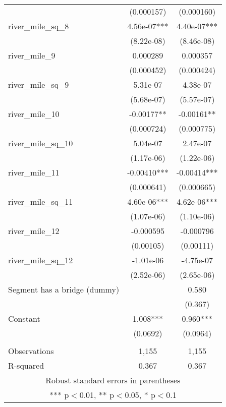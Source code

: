 \begin{tabular}{lcc}
 & (0.000157) & (0.000160) \\
river\_mile\_sq\_8 & 4.56e-07*** & 4.40e-07*** \\
 & (8.22e-08) & (8.46e-08) \\
river\_mile\_9 & 0.000289 & 0.000357 \\
 & (0.000452) & (0.000424) \\
river\_mile\_sq\_9 & 5.31e-07 & 4.38e-07 \\
 & (5.68e-07) & (5.57e-07) \\
river\_mile\_10 & -0.00177** & -0.00161** \\
 & (0.000724) & (0.000775) \\
river\_mile\_sq\_10 & 5.04e-07 & 2.47e-07 \\
 & (1.17e-06) & (1.22e-06) \\
river\_mile\_11 & -0.00410*** & -0.00414*** \\
 & (0.000641) & (0.000665) \\
river\_mile\_sq\_11 & 4.60e-06*** & 4.62e-06*** \\
 & (1.07e-06) & (1.10e-06) \\
river\_mile\_12 & -0.000595 & -0.000796 \\
 & (0.00105) & (0.00111) \\
river\_mile\_sq\_12 & -1.01e-06 & -4.75e-07 \\
 & (2.52e-06) & (2.65e-06) \\
Segment has a bridge (dummy) &  & 0.580 \\
 &  & (0.367) \\
Constant & 1.008*** & 0.960*** \\
 & (0.0692) & (0.0964) \\
 &  &  \\
Observations & 1,155 & 1,155 \\
 R-squared & 0.367 & 0.367 \\ \hline
\multicolumn{3}{c}{ Robust standard errors in parentheses} \\
\multicolumn{3}{c}{ *** p$<$0.01, ** p$<$0.05, * p$<$0.1} \\
\end{tabular}
